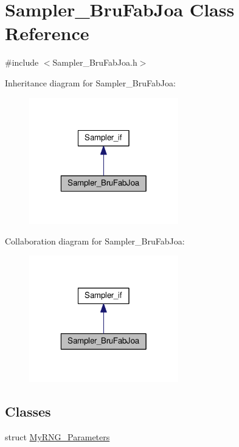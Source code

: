 \hypertarget{class_sampler___bru_fab_joa}{\section{Sampler\-\_\-\-Bru\-Fab\-Joa Class Reference}
\label{class_sampler___bru_fab_joa}
}


{\ttfamily \#include $<$Sampler\-\_\-\-Bru\-Fab\-Joa.\-h$>$}



Inheritance diagram for Sampler\-\_\-\-Bru\-Fab\-Joa\-:\nopagebreak
\begin{figure}[H]
\begin{center}
\leavevmode
\includegraphics[width=184pt]{class_sampler___bru_fab_joa__inherit__graph}
\end{center}
\end{figure}


Collaboration diagram for Sampler\-\_\-\-Bru\-Fab\-Joa\-:\nopagebreak
\begin{figure}[H]
\begin{center}
\leavevmode
\includegraphics[width=184pt]{class_sampler___bru_fab_joa__coll__graph}
\end{center}
\end{figure}
\subsection*{Classes}
\begin{DoxyCompactItemize}
\item 
struct \hyperlink{struct_sampler___bru_fab_joa_1_1_my_r_n_g___parameters}{My\-R\-N\-G\-\_\-\-Parameters}
\end{DoxyCompactItemize}

